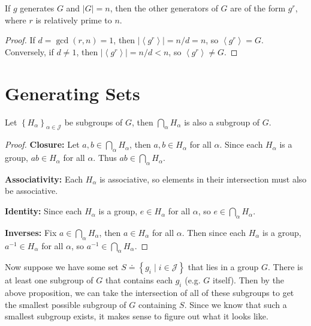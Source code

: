 \documentclass[10pt]{report}
\begin{document}
\begin{cor}
	If $g$ generates $G$ and $|G|=n$, then the other generators of $G$ are of the form $g^r$, where $r$ is relatively prime to $n$.
\end{cor}
\begin{proof}
	If $d = \gcd(r,n)=1$, then $|\left\langle g^r \right\rangle| = n/d = n$, so $\left\langle g^r \right\rangle=G$. Conversely, if $d \neq 1$, then $|\left\langle g^r \right\rangle| = n/d < n$, so $\left\langle g^r \right\rangle\neq G$.
\end{proof}


\section{Generating Sets}

\begin{prop}
	Let $\left\{ H_{\alpha} \right\}_{\alpha \in \mathcal{J}}$ be subgroups of $G$, then $\bigcap_{\alpha}H_{\alpha}$ is also a subgroup of $G$.
\end{prop}
\begin{proof}
	\textbf{Closure:} Let $a,b \in \bigcap_{\alpha}H_{\alpha}$, then $a,b \in H_{\alpha}$ for all $\alpha$. Since each $H_{\alpha}$ is a group, $ab \in H_{\alpha}$ for all $\alpha$. Thus $ab \in \bigcap_{\alpha}H_{\alpha}$.

	\textbf{Associativity:} Each $H_{\alpha}$ is associative, so elements in their intersection must also be associative.

	\textbf{Identity:} Since each $H_{\alpha}$ is a group, $e \in H_{\alpha}$ for all $\alpha$, so $e \in \bigcap_{\alpha}H_{\alpha}$.

	\textbf{Inverses:} Fix $a \in \bigcap_{\alpha}H_{\alpha}$, then $a \in H_{\alpha}$ for all $\alpha$. Then since each $H_{\alpha}$ is a group, $a^{-1} \in H_{\alpha}$ for all $\alpha$, so $a^{-1} \in \bigcap_{\alpha}H_{\alpha}$.
\end{proof}

Now suppose we have some set $S \doteq \left\{ g_i \;|\; i \in \mathcal{J}\right\}$ that lies in a group $G$. There is at least one subgroup of $G$ that contains each $g_i$ (e.g. $G$ itself). Then by the above proposition, we can take the intersection of all of these subgroups to get the smallest possible subgroup of $G$ containing $S$. Since we know that such a smallest subgroup exists, it makes sense to figure out what it looks like.
\end{document}
